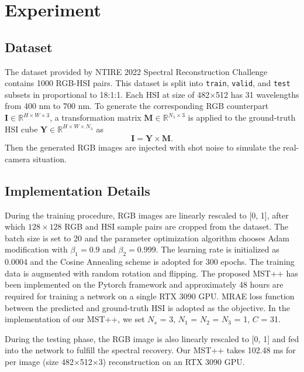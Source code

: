 \documentclass[10pt,twocolumn,letterpaper]{article}
\begin{document}
\section{Experiment}
\subsection{Dataset}
The dataset provided by NTIRE 2022 Spectral Reconstruction Challenge contains 1000 RGB-HSI pairs. This dataset is split into \texttt{train},  \texttt{valid}, and \texttt{test} subsets  in proportional to 18:1:1. Each HSI at size of 482$\times$512 has 31 wavelengths from 400 nm to 700 nm. To generate the corresponding RGB counterpart $\mathbf{I} \in \mathbb{R}^{H\times W\times 3}$, a transformation matrix $\mathbf{M} \in \mathbb{R}^{N_{\lambda}\times3}$ is applied to the ground-truth HSI cube $\mathbf{Y} \in \mathbb{R}^{H\times W\times N_{\lambda}}$ as 
\begin{equation}
	\mathbf{I} = \mathbf{Y} \times \mathbf{M}.
\end{equation}
Then the generated RGB images are injected with shot noise to simulate the real-camera situation. 

\subsection{Implementation Details}
During the training procedure, RGB images are linearly rescaled to [0, 1], after which $128\times 128$ RGB and HSI sample pairs are cropped from the dataset. The batch size is set to 20 and the parameter optimization algorithm chooses Adam modification with $\beta_1=0.9$ and $\beta_2=0.999$. The learning rate is initialized as 0.0004 and the Cosine Annealing scheme is adopted for 300 epochs. The training data is augmented with random rotation and flipping. The proposed MST++ has been implemented on the Pytorch framework and approximately 48 hours are required for training a network on a single RTX 3090 GPU. MRAE loss function between the predicted and ground-truth HSI is adopted as the objective. In the implementation of our MST++, we set $N_s$ = 3, $N_1$ = $N_2$ = $N_3$ = 1, $C$ = 31. 

During the testing phase, the RGB image is also linearly rescaled to [0, 1] and fed into the network to fulfill the spectral recovery. Our MST++ takes 102.48 ms for per image (size 482$\times$512$\times$3) reconstruction on an RTX 3090 GPU.
\end{document}
